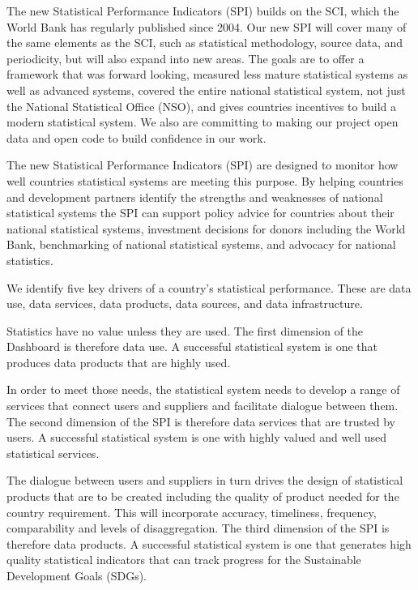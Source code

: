 \documentclass[
]{article}
\begin{document}
The new Statistical Performance Indicators (SPI) builds on the SCI,
which the World Bank has regularly published since 2004. Our new SPI
will cover many of the same elements as the SCI, such as statistical
methodology, source data, and periodicity, but will also expand into new
areas. The goals are to offer a framework that was forward looking,
measured less mature statistical systems as well as advanced systems,
covered the entire national statistical system, not just the National
Statistical Office (NSO), and gives countries incentives to build a
modern statistical system. We also are committing to making our project
open data and open code to build confidence in our work.

The new Statistical Performance Indicators (SPI) are designed to monitor
how well countries statistical systems are meeting this purpose. By
helping countries and development partners identify the strengths and
weaknesses of national statistical systems the SPI can support policy
advice for countries about their national statistical systems,
investment decisions for donors including the World Bank, benchmarking
of national statistical systems, and advocacy for national statistics.

We identify five key drivers of a country's statistical performance.
These are data use, data services, data products, data sources, and data
infrastructure.

Statistics have no value unless they are used. The first dimension of
the Dashboard is therefore data use. A successful statistical system is
one that produces data products that are highly used.

In order to meet those needs, the statistical system needs to develop a
range of services that connect users and suppliers and facilitate
dialogue between them. The second dimension of the SPI is therefore data
services that are trusted by users. A successful statistical system is
one with highly valued and well used statistical services.

The dialogue between users and suppliers in turn drives the design of
statistical products that are to be created including the quality of
product needed for the country requirement. This will incorporate
accuracy, timeliness, frequency, comparability and levels of
disaggregation. The third dimension of the SPI is therefore data
products. A successful statistical system is one that generates high
quality statistical indicators that can track progress for the
Sustainable Development Goals (SDGs).
\end{document}
